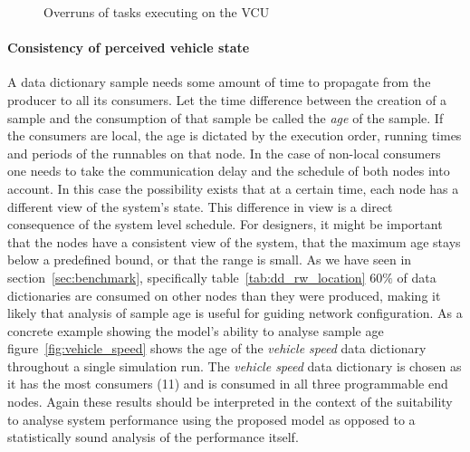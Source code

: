 \begin{figure}[htb]
    \centering
    
    \caption{Overruns of tasks executing on the VCU}
    \label{fig:task_overrun}
\end{figure}

\paragraph{Consistency of perceived vehicle state}
A data dictionary sample needs some amount of time to propagate from the producer to all its consumers. Let the time difference between the creation of a sample and the consumption of that sample be called the \textit{age} of the sample. If the consumers are local, the age is dictated by the execution order, running times and periods of the runnables on that node. In the case of non-local consumers one needs to take the communication delay and the schedule of both nodes into account. In this case the possibility exists that at a certain time, each node has a different view of the system's state. This difference in view is a direct consequence of the system level schedule. For designers, it might be important that the nodes have a consistent view of the system, that the maximum age stays below a predefined bound, or that the range is small. As we have seen in section~\ref{sec:benchmark}, specifically table~\ref{tab:dd_rw_location} $60\%$ of data dictionaries are consumed on other nodes than they were produced, making it likely that analysis of sample age is useful for guiding network configuration. As a concrete example showing the model's ability to analyse sample age figure~\ref{fig:vehicle_speed} shows the age of the \textit{vehicle speed} data dictionary throughout a single simulation run. The \textit{vehicle speed} data dictionary is chosen as it has the most consumers (11) and is consumed in all three programmable end nodes. Again these results should be interpreted in the context of the suitability to analyse system performance using the proposed model as opposed to a statistically sound analysis of the performance itself.


